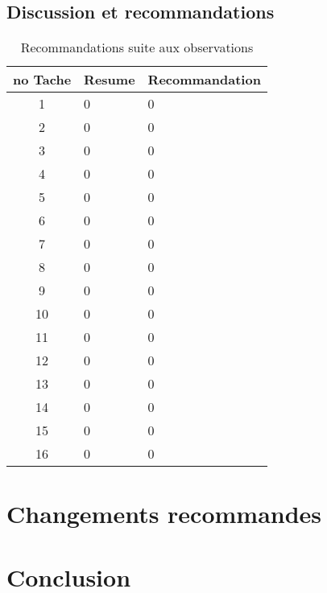 \documentclass[letterpaper, oneside, 12pt, these, creativecommons]{thETS}
\begin{document}
\section{Discussion et recommandations}

\begin{table}
	\centering
	\begin{tabular}{|c|l|l|}
	\hline
	no Tache	& Resume	& Recommandation 	\\ \hline
	1		& 0		& 0 			\\ \hline
	2		& 0		& 0 			\\ \hline
	3		& 0		& 0 			\\ \hline
	4		& 0		& 0 			\\ \hline
	5		& 0		& 0 			\\ \hline
	6		& 0		& 0 			\\ \hline
	7		& 0		& 0 			\\ \hline
	8		& 0		& 0 			\\ \hline
	9		& 0		& 0 			\\ \hline
	10		& 0		& 0 			\\ \hline
	11		& 0		& 0 			\\ \hline
	12		& 0		& 0 			\\ \hline
	13		& 0		& 0 			\\ \hline
	14		& 0		& 0 			\\ \hline
	15		& 0		& 0 			\\ \hline
	16		& 0		& 0 			\\ \hline
	\end{tabular}
	\caption{Recommandations suite aux observations}
\end{table}

\chapter{Changements recommandes}

\chapter{Conclusion}
\end{document}
